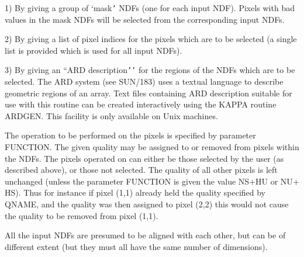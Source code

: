 \begin{small}
{{      1) By giving a group of `mask{\tt '} NDFs (one for each input NDF).
      Pixels with bad values in the mask NDFs will be selected from the
      corresponding input NDFs.

      2) By giving a list of pixel indices for the pixels which are to
      be selected (a single list is provided which is used for all input
      NDFs).

      3) By giving an ``ARD description{\tt '}{\tt '} for the regions of the NDFs
      which are to be selected. The ARD system (see SUN/183) uses a
      textual language to describe geometric regions of an array. Text
      files containing ARD description suitable for use with this
      routine can be created interactively using the KAPPA routine
      ARDGEN. This facility is only available on Unix machines.

      The operation to be performed on the pixels is specified by
      parameter FUNCTION. The given quality may be assigned to or
      removed from pixels within the NDFs. The pixels operated on
      can either be those selected by the user (as described above),
      or those not selected.  The quality of all other pixels is left
      unchanged (unless the parameter FUNCTION is given the value NS$+$HU
      or NU$+$HS). Thus for instance if pixel (1,1) already held the
      quality specified by QNAME, and the quality was then assigned to
      pixel (2,2) this would not cause the quality to be removed from
      pixel (1,1).

      All the input NDFs are presumed to be aligned with each other, but
      can be of different extent (but they must all have the same number
      of dimensions).
   }
   }
\end{small}
